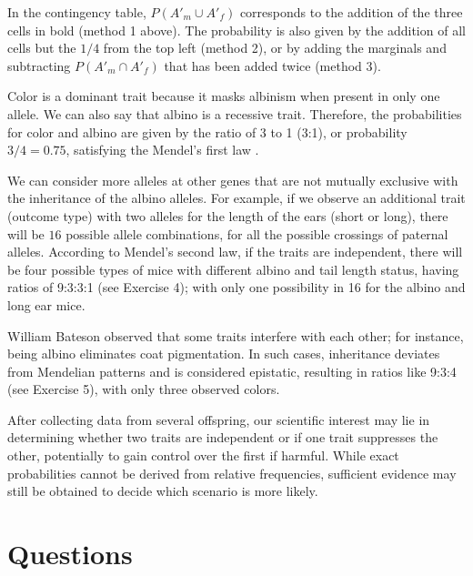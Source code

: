 \documentclass[
]{book}
\begin{document}
In the contingency table, \(P( A'_m \cup A'_f)\) corresponds to the addition of the three cells in bold (method 1 above). The probability is also given by the addition of all cells but the \(1/4\) from the top left (method 2), or by adding the marginals and subtracting \(P(A'_m\cap A'_f)\) that has been added twice (method 3).

Color is a dominant trait because it masks albinism when present in only one allele. We can also say that albino is a recessive trait. Therefore, the probabilities for color and albino are given by the ratio of 3 to 1 (3:1), or probability \(3/4=0.75\), satisfying the Mendel's first law \citep{mendel1901experiments}.

We can consider more alleles at other genes that are not mutually exclusive with the inheritance of the albino alleles. For example, if we observe an additional trait (outcome type) with two alleles for the length of the ears (short or long), there will be \(16\) possible allele combinations, for all the possible crossings of paternal alleles. According to Mendel's second law, if the traits are independent, there will be four possible types of mice with different albino and tail length status, having ratios of 9:3:3:1 (see Exercise 4); with only one possibility in 16 for the albino and long ear mice.

William Bateson observed that some traits interfere with each other; for instance, being albino eliminates coat pigmentation. In such cases, inheritance deviates from Mendelian patterns and is considered epistatic, resulting in ratios like 9:3:4 (see Exercise 5), with only three observed colors.

After collecting data from several offspring, our scientific interest may lie in determining whether two traits are independent or if one trait suppresses the other, potentially to gain control over the first if harmful. While exact probabilities cannot be derived from relative frequencies, sufficient evidence may still be obtained to decide which scenario is more likely.

\hypertarget{questions-1}{%
\section{Questions}\label{questions-1}}
\end{document}
